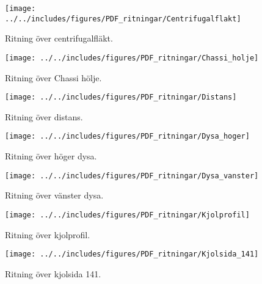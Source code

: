\begin{landscape}
\begin{figure}[htbp!]
\centering
\texttt{[image: ../../includes/figures/PDF\_ritningar/Centrifugalflakt]}
\caption{Ritning över centrifugalfläkt.}
\label{fig:Centrifugalfläkt}
\end{figure}
\end{landscape}

\begin{landscape}
\begin{figure}[htbp!]
\centering
\texttt{[image: ../../includes/figures/PDF\_ritningar/Chassi\_holje]}
\caption{Ritning över Chassi hölje.}
\label{fig:Chassi_holje}
\end{figure}
\end{landscape}

\begin{landscape}
\begin{figure}[htbp!]
\centering
\texttt{[image: ../../includes/figures/PDF\_ritningar/Distans]}
\caption{Ritning över distans.}
\label{fig:Distans}
\end{figure}
\end{landscape}

\begin{landscape}
\begin{figure}[htbp!]
\centering
\texttt{[image: ../../includes/figures/PDF\_ritningar/Dysa\_hoger]}
\caption{Ritning över höger dysa.}
\label{fig:Dysa-höger}
\end{figure}
\end{landscape}

\begin{landscape}
\begin{figure}[htbp!]
\centering
\texttt{[image: ../../includes/figures/PDF\_ritningar/Dysa\_vanster]}
\caption{Ritning över vänster dysa.}
\label{fig:Dysa-vänster}
\end{figure}
\end{landscape}

\begin{landscape}
\begin{figure}[htbp!]
\centering
\texttt{[image: ../../includes/figures/PDF\_ritningar/Kjolprofil]}
\caption{Ritning över kjolprofil.}
\label{fig:Kjolprofil}
\end{figure}
\end{landscape}

\begin{landscape}
\begin{figure}[htbp!]
\centering
\texttt{[image: ../../includes/figures/PDF\_ritningar/Kjolsida\_141]}
\caption{Ritning över kjolsida 141.}
\label{fig:kjolsida141}
\end{figure}
\end{landscape}

